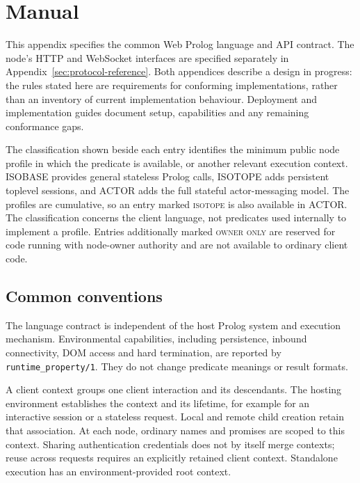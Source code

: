 \chapter{Manual}\label{sec:manual}

\begingroup
\setlength{\emergencystretch}{1.5em}

\vspace{10mm}
This appendix specifies the common Web Prolog language and API contract.
The node's HTTP and WebSocket interfaces are specified separately in
Appendix~\ref{sec:protocol-reference}. Both appendices describe a design in
progress: the rules stated here are requirements for conforming
implementations, rather than an inventory of current implementation behaviour.
Deployment and implementation guides document setup, capabilities and any
remaining conformance gaps.

The classification shown beside each entry identifies the minimum public node
profile in which the predicate is available, or another relevant execution
context. ISOBASE provides general stateless Prolog calls, ISOTOPE adds
persistent toplevel sessions, and ACTOR adds the full stateful actor-messaging
model. The profiles are cumulative, so an entry marked \textsc{isotope} is
also available in ACTOR. The classification concerns the client language, not
predicates used internally to implement a profile. Entries additionally marked
\textsc{owner only} are reserved for code running with node-owner authority and
are not available to ordinary client code.

\section{Common conventions}\label{sec:manual-conventions}
The language contract is independent of the host Prolog system and execution
mechanism. Environmental capabilities, including persistence, inbound
connectivity, DOM access and hard termination, are reported by
\texttt{runtime\_property/1}. They do not change predicate meanings or result
formats.

A client context groups one client interaction and its descendants. The
hosting environment establishes the context and its lifetime, for example
for an interactive session or a stateless request. Local and remote child
creation retain that association. At each node, ordinary names and promises
are scoped to this context. Sharing authentication credentials does not by itself merge
contexts; reuse across requests requires an explicitly retained client
context. Standalone execution has an environment-provided root context.

